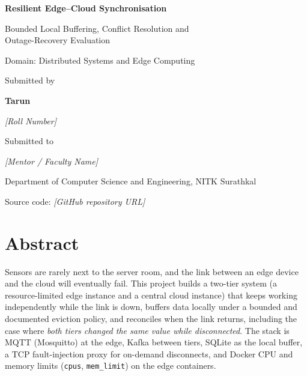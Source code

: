 \documentclass[11pt,a4paper]{article}
\newcommand{\authorname}{Tarun}
\newcommand{\rollno}{\textit{[Roll Number]}}
\newcommand{\mentor}{\textit{[Mentor / Faculty Name]}}
\newcommand{\institution}{Department of Computer Science and Engineering, NITK Surathkal}
\newcommand{\repourl}{\textit{[GitHub repository URL]}}
\begin{document}
\begin{titlepage}
\centering\vspace*{2.5cm}
{\Huge\bfseries Resilient Edge--Cloud Synchronisation\par}
\vspace{0.4cm}
{\Large Bounded Local Buffering, Conflict Resolution and\\ Outage-Recovery Evaluation\par}
\vspace{0.6cm}
{\large Domain: Distributed Systems and Edge Computing\par}
\vspace{2.2cm}
{\large Submitted by\par}\vspace{2pt}
{\Large\bfseries \authorname\par}\vspace{2pt}
{\large \rollno\par}
\vspace{1.2cm}
{\large Submitted to\par}\vspace{2pt}
{\Large \mentor\par}
\vspace{1.2cm}
{\large \institution\par}
\vspace{0.4cm}{\large November 2026\par}
\vfill
{\small Source code: \repourl}
\end{titlepage}

\tableofcontents
\newpage

\section*{Abstract}
Sensors are rarely next to the server room, and the link between an edge device and the cloud
will eventually fail. This project builds a two-tier system (a resource-limited edge instance and
a central cloud instance) that keeps working independently while the link is down, buffers data
locally under a bounded and documented eviction policy, and reconciles when the link returns,
including the case where \emph{both tiers changed the same value while disconnected}.
The stack is MQTT (Mosquitto) at the edge, Kafka between tiers, SQLite as the local buffer,
a TCP fault-injection proxy for on-demand disconnects, and Docker CPU and memory limits (\texttt{cpus}, \texttt{mem\_limit})
 on the edge containers.
\end{document}
